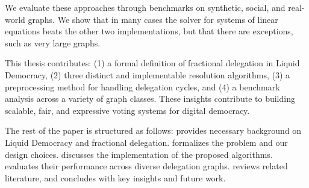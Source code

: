 We evaluate these approaches through benchmarks on synthetic, social, and real-world graphs. We show that in many cases the solver for systems of linear equations beats the other two implementations, but that there are exceptions, such as very large graphs.

This thesis contributes: (1) a formal definition of fractional delegation in Liquid Democracy, (2) three distinct and implementable resolution algorithms, (3) a preprocessing method for handling delegation cycles, and (4) a benchmark analysis across a variety of graph classes. These insights contribute to building scalable, fair, and expressive voting systems for digital democracy.

The rest of the paper is structured as follows:  provides necessary background on Liquid Democracy and fractional delegation.  formalizes the problem and our design choices.  discusses the implementation of the proposed algorithms.  evaluates their performance across diverse delegation graphs.  reviews related literature, and  concludes with key insights and future work.